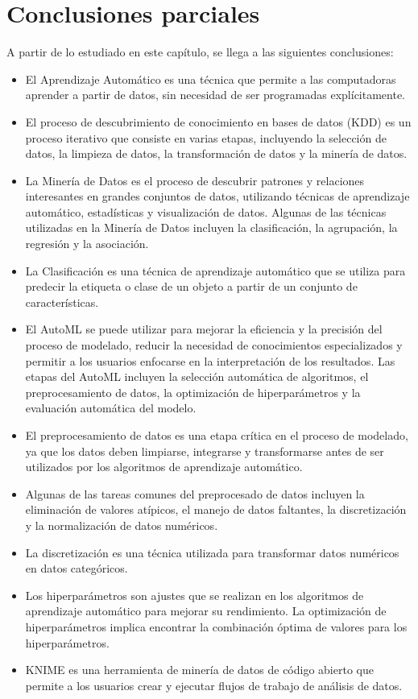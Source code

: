 \section{Conclusiones parciales}


A partir de lo estudiado en este capítulo, se llega a las siguientes conclusiones:

\begin{itemize}
	\item El Aprendizaje Automático es una técnica que permite a las computadoras aprender a partir de datos, sin necesidad de ser programadas explícitamente.
	\item El proceso de descubrimiento de conocimiento en bases de datos (KDD) es un proceso iterativo que consiste en varias etapas, incluyendo la selección de datos, la limpieza de datos, la transformación de datos y la minería de datos.
	\item La Minería de Datos es el proceso de descubrir patrones y relaciones interesantes en grandes conjuntos de datos, utilizando técnicas de aprendizaje automático, estadísticas y visualización de datos. Algunas de las técnicas utilizadas en la Minería de Datos incluyen la clasificación, la agrupación, la regresión y la asociación.
	\item La Clasificación es una técnica de aprendizaje automático que se utiliza para predecir la etiqueta o clase de un objeto a partir de un conjunto de características.
	\item El AutoML se puede utilizar para mejorar la eficiencia y la precisión del proceso de modelado, reducir la necesidad de conocimientos especializados y permitir a los usuarios enfocarse en la interpretación de los resultados. Las etapas del AutoML incluyen la selección automática de algoritmos, el preprocesamiento de datos, la optimización de hiperparámetros y la evaluación automática del modelo.
	\item El preprocesamiento de datos es una etapa crítica en el proceso de modelado, ya que los datos deben limpiarse, integrarse y transformarse antes de ser utilizados por los algoritmos de aprendizaje automático.
	\item Algunas de las tareas comunes del preprocesado de datos incluyen la eliminación de valores atípicos, el manejo de datos faltantes, la discretización y la normalización de datos numéricos.
	\item La discretización es una técnica utilizada para transformar datos numéricos en datos categóricos.
	\item Los hiperparámetros son ajustes que se realizan en los algoritmos de aprendizaje automático para mejorar su rendimiento. La optimización de hiperparámetros implica encontrar la combinación óptima de valores para los hiperparámetros.
	\item KNIME es una herramienta de minería de datos de código abierto que permite a los usuarios crear y ejecutar flujos de trabajo de análisis de datos.
\end{itemize}


